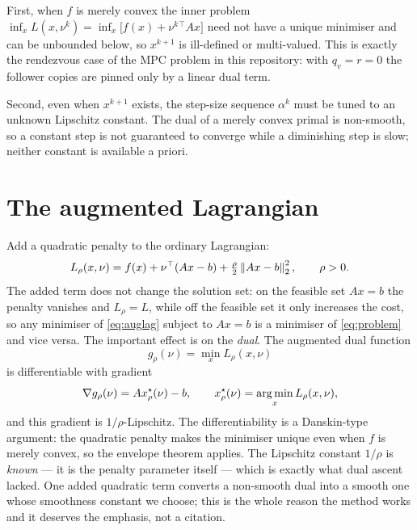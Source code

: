 \documentclass[11pt]{article}
\begin{document}
First, when $f$ is merely convex the inner problem
$\inf_x L(x,\nu^k) = \inf_x \big[ f(x) + \nu^k{}^\top A x \big]$ need not have a unique
minimiser and can be unbounded below, so $x^{k+1}$ is ill-defined or multi-valued. This is
exactly the rendezvous case of the MPC problem in this repository: with $q_v = r = 0$ the
follower copies are pinned only by a linear dual term.

Second, even when $x^{k+1}$ exists, the step-size sequence $\alpha^k$ must be tuned to an
unknown Lipschitz constant. The dual of a merely convex primal is non-smooth, so a constant
step is not guaranteed to converge while a diminishing step is slow; neither constant is
available a priori.

\section{The augmented Lagrangian}
\label{sec:augmented}

Add a quadratic penalty to the ordinary Lagrangian:
\begin{equation}
L_\rho(x,\nu) = f(x) + \nu^\top(Ax-b) + \tfrac{\rho}{2}\left\lVert Ax-b \right\rVert_2^2,
\qquad \rho > 0.
\label{eq:auglag}
\end{equation}
The added term does not change the solution set: on the feasible set $Ax = b$ the penalty
vanishes and $L_\rho = L$, while off the feasible set it only increases the cost, so any
minimiser of \eqref{eq:auglag} subject to $Ax=b$ is a minimiser of \eqref{eq:problem} and
vice versa. The important effect is on the \emph{dual}. The augmented dual function
\begin{equation}
g_\rho(\nu) = \min_x L_\rho(x,\nu)
\end{equation}
is differentiable with gradient
\begin{equation}
\nabla g_\rho(\nu) = A x^\star_\rho(\nu) - b,
\qquad
x^\star_\rho(\nu) = \operatorname*{arg\,min}_x L_\rho(x,\nu),
\label{eq:danskin}
\end{equation}
and this gradient is $1/\rho$-Lipschitz. The differentiability is a Danskin-type argument:
the quadratic penalty makes the minimiser unique even when $f$ is merely convex, so the
envelope theorem applies. The Lipschitz constant $1/\rho$ is \emph{known} --- it is the
penalty parameter itself --- which is exactly what dual ascent lacked. One added quadratic
term converts a non-smooth dual into a smooth one whose smoothness constant we choose; this
is the whole reason the method works and it deserves the emphasis, not a citation.
\end{document}
